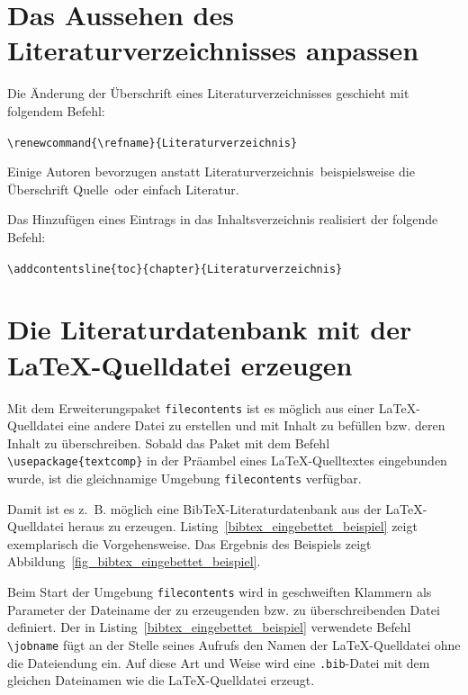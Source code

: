 \documentclass[a4paper,10pt,twoside]{scrbook}
\begin{document}
{\section{Das Aussehen des Literaturverzeichnisses anpassen}
\label{Abschnitt_Literaturverzeichnis_anpassen}

Die Änderung der Überschrift eines Literaturverzeichnisses geschieht mit folgendem Befehl:

\begin{boxedminipage}{\textwidth}
\texttt{\textbackslash renewcommand\{\textbackslash refname\}\{Literaturverzeichnis\}}
\end{boxedminipage}

Einige Autoren bevorzugen anstatt \glqq Literaturverzeichnis\grqq\ beispielsweise die Überschrift \glqq Quelle\grqq\ oder einfach \grqq Literatur\grqq.

Das Hinzufügen eines Eintrags in das Inhaltsverzeichnis realisiert der folgende Befehl:


\begin{boxedminipage}{\textwidth}
\texttt{\textbackslash addcontentsline\{toc\}\{chapter\}\{Literaturverzeichnis\}}
\end{boxedminipage}




\section{Die Literaturdatenbank mit der \LaTeX-Quelldatei erzeugen}
\label{Abschnitt_Literaturdatenbank_Quelldatei_erzeugen}

Mit dem Erweiterungspaket \verb|filecontents| ist es möglich aus einer \LaTeX-Quelldatei eine andere Datei zu erstellen und mit Inhalt zu befüllen bzw. deren Inhalt zu überschreiben. Sobald das Paket mit dem Befehl \verb!\usepackage{textcomp}! in der Präambel eines \LaTeX-Quelltextes eingebunden wurde, ist die gleichnamige Umgebung \verb|filecontents| verfügbar.

Damit ist es z.~B. möglich eine Bib\TeX-Literaturdatenbank aus der \LaTeX-Quelldatei heraus zu erzeugen.
Listing~\ref{bibtex_eingebettet_beispiel} zeigt exemplarisch die Vorgehensweise. Das Ergebnis des
Beispiels zeigt Abbildung~\ref{fig_bibtex_eingebettet_beispiel}.

Beim Start der Umgebung \verb|filecontents| wird in geschweiften Klammern als Parameter der Dateiname der zu erzeugenden bzw. zu überschreibenden Datei definiert. Der in Listing~\ref{bibtex_eingebettet_beispiel} verwendete Befehl \verb|\jobname| fügt an der Stelle seines Aufrufs den Namen der \LaTeX-Quelldatei ohne die Dateiendung ein. Auf diese Art und Weise wird eine \verb|.bib|-Datei mit dem gleichen Dateinamen wie die \LaTeX-Quelldatei erzeugt.

}
\end{document}
